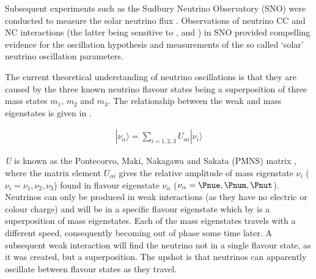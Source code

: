 Subsequent experiments such as the Sudbury Neutrino Observatory (SNO) were conducted to measure the solar neutrino flux \cite{Ahmad:2002jz}. Observations of neutrino CC and NC interactions (the latter being sensitive to \Pnue, \Pnum and \Pnut) in SNO provided compelling evidence for the oscillation hypothesis and measurements of the so called `solar' neutrino oscillation parameters.

The current theoretical understanding of neutrino oscillations is that they are caused by the three known neutrino flavour states being a superposition of three mass states \textit{$m_{1}$}, \textit{$m_{2}$} and \textit{$m_{3}$}. The relationship between the weak and mass eigenstates is given in .

\begin{gather}
  |\nu_{\alpha}\rangle = \sum\limits_{i=1,2,3}U_{\alpha i}|\nu_{i}\rangle
  \label{eq:particle-physics:neutrino-flavour-mass-relation}
\end{gather}


\textit{U} is known as the Pontecorvo, Maki, Nakagawa and Sakata (PMNS) matrix \cite{1968JETP...26..984P} \cite{1962PThPh..28..870M}, where the matrix element $U_{\alpha i}$ gives the relative amplitude of mass eigenstate $\nu_{i}$ ($\nu_{i}=\nu_{1},\nu_{2},\nu_{3}$) found in flavour eigenstate $\nu_{\alpha}$ ($\nu_{\alpha}=\Pnue,\Pnum,\Pnut$). Neutrinos can only be produced in weak interactions (as they have no electric or colour charge) and will be in a specific flavour eigenstate which by  is a superposition of mass eigenstates. Each of the mass eigenstates travels with a different speed, consequently becoming out of phase some time later. A subsequent weak interaction will find the neutrino not in a single flavour state, as it was created, but a superposition. The upshot is that neutrinos can apparently oscillate between flavour states as they travel. 

